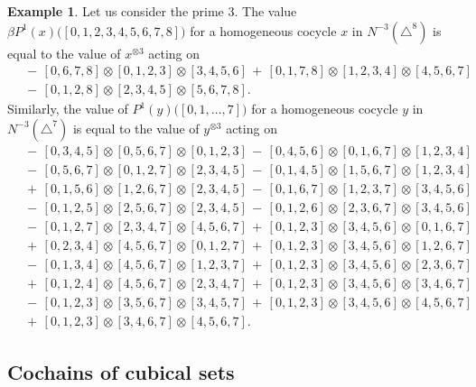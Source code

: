 \documentclass[A4]{amsart}
\theoremstyle{definition}
\newtheorem{example}[theorem]{Example}
\begin{document}
\begin{example}
	Let us consider the prime $3$. The value $\beta P^1(x)\big([0,1,2,3,4,5,6,7,8]\big)$ for a homogeneous cocycle $x$ in $N^{-3}(\triangle^8)$ is equal to the value of $x^{\otimes 3}$ acting on
	\begin{align*}
	& \,-\, [0, 6, 7, 8] \otimes [0, 1, 2, 3] \otimes [3, 4, 5, 6] \,+\, [0, 1, 7, 8] \otimes [1, 2, 3, 4] \otimes [4, 5, 6, 7] \\ & \,-\, [0, 1, 2, 8] \otimes [2, 3, 4, 5] \otimes [5, 6, 7, 8].
	\end{align*}
	Similarly, the value of $P^1(y)\big([0,1,\dots,7]\big)$ for a homogeneous cocycle $y$ in $N^{-3}(\triangle^7)$ is equal to the value of $y^{\otimes 3}$ acting on
	\begin{align*}
	& \,-\, [0,3,4,5] \otimes [0,5,6,7] \otimes [0,1,2,3] \,-\, [0,4,5,6] \otimes [0,1,6,7] \otimes [1,2,3,4] \\ & \,-\, [0,5,6,7] \otimes [0,1,2,7] \otimes [2,3,4,5] \,-\, [0,1,4,5] \otimes [1,5,6,7] \otimes [1,2,3,4] \\ & \,+\, [0,1,5,6] \otimes [1,2,6,7] \otimes [2,3,4,5] \,-\, [0,1,6,7] \otimes [1,2,3,7] \otimes [3,4,5,6] \\ & \,-\, [0,1,2,5] \otimes [2,5,6,7] \otimes [2,3,4,5] \,-\, [0,1,2,6] \otimes [2,3,6,7] \otimes [3,4,5,6] \\ & \,-\, [0,1,2,7] \otimes [2,3,4,7] \otimes [4,5,6,7] \,+\, [0,1,2,3] \otimes [3,4,5,6] \otimes [0,1,6,7] \\ & \,+\, [0,2,3,4] \otimes [4,5,6,7] \otimes [0,1,2,7] \,+\, [0,1,2,3] \otimes [3,4,5,6] \otimes [1,2,6,7] \\ & \,-\, [0,1,3,4] \otimes [4,5,6,7] \otimes [1,2,3,7] \,+\, [0,1,2,3] \otimes [3,4,5,6] \otimes [2,3,6,7] \\ & \,+\, [0,1,2,4] \otimes [4,5,6,7] \otimes [2,3,4,7] \,+\, [0,1,2,3] \otimes [3,4,5,6] \otimes [3,4,6,7] \\ & \,-\, [0,1,2,3] \otimes [3,5,6,7] \otimes [3,4,5,7] \,+\, [0,1,2,3] \otimes [3,4,5,6] \otimes [4,5,6,7] \\ & \,+\, [0,1,2,3] \otimes [3,4,6,7] \otimes [4,5,6,7].
	\end{align*}
\end{example}

\subsection{Cochains of cubical sets}
\end{document}
